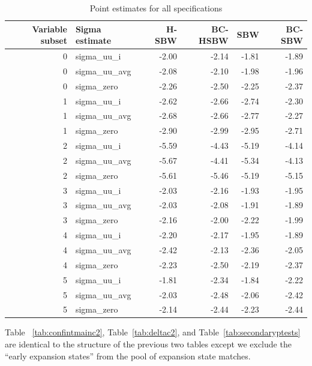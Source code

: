 \documentclass{article}
\begin{document}
\begin{appendix}
\begin{table}[ht]
\centering
\caption{Point estimates for all specifications}
\label{tab:ptests}
\begin{tabular}{rlrrrr}
  \hline
Variable subset & Sigma estimate & H-SBW & BC-HSBW & SBW & BC-SBW \\ 
  \hline
0 & sigma\_uu\_i & -2.00 & -2.14 & -1.81 & -1.89 \\ 
  0 & sigma\_uu\_avg & -2.08 & -2.10 & -1.98 & -1.96 \\ 
  0 & sigma\_zero & -2.26 & -2.50 & -2.25 & -2.37 \\ 
  1 & sigma\_uu\_i & -2.62 & -2.66 & -2.74 & -2.30 \\ 
  1 & sigma\_uu\_avg & -2.68 & -2.66 & -2.77 & -2.27 \\ 
  1 & sigma\_zero & -2.90 & -2.99 & -2.95 & -2.71 \\ 
  2 & sigma\_uu\_i & -5.59 & -4.43 & -5.19 & -4.14 \\ 
  2 & sigma\_uu\_avg & -5.67 & -4.41 & -5.34 & -4.13 \\ 
  2 & sigma\_zero & -5.61 & -5.46 & -5.19 & -5.15 \\ 
  3 & sigma\_uu\_i & -2.03 & -2.16 & -1.93 & -1.95 \\ 
  3 & sigma\_uu\_avg & -2.03 & -2.08 & -1.91 & -1.89 \\ 
  3 & sigma\_zero & -2.16 & -2.00 & -2.22 & -1.99 \\ 
  4 & sigma\_uu\_i & -2.20 & -2.17 & -1.95 & -1.89 \\ 
  4 & sigma\_uu\_avg & -2.42 & -2.13 & -2.36 & -2.05 \\ 
  4 & sigma\_zero & -2.23 & -2.50 & -2.19 & -2.37 \\ 
  5 & sigma\_uu\_i & -1.81 & -2.34 & -1.84 & -2.22 \\ 
  5 & sigma\_uu\_avg & -2.03 & -2.48 & -2.06 & -2.42 \\ 
  5 & sigma\_zero & -2.14 & -2.44 & -2.23 & -2.44 \\ 
   \hline
\end{tabular}
\end{table}

Table ~\ref{tab:confintmainc2}, Table~\ref{tab:deltac2}, and Table~\ref{tab:secondaryptests} are identical to the structure of the previous two tables except we exclude the ``early expansion states'' from the pool of expansion state matches. 


\end{appendix}
\end{document}
